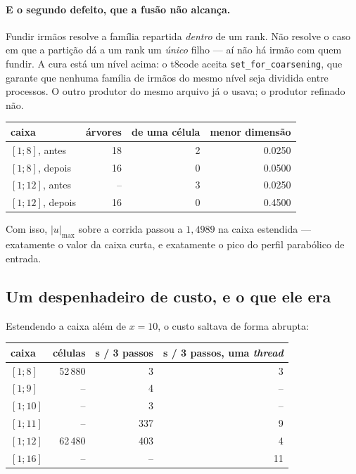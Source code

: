 \paragraph{E o segundo defeito, que a fusão não alcança.} Fundir irmãos resolve
a família repartida \emph{dentro} de um rank. Não resolve o caso em que a
partição dá a um rank um \emph{único} filho --- aí não há irmão com quem fundir.
A cura está um nível acima: o t8code aceita \texttt{set\_for\_coarsening}, que
garante que nenhuma família de irmãos do mesmo nível seja dividida entre
processos. O outro produtor do mesmo arquivo já o usava; o produtor refinado não.

\begin{center}
\begin{tabular}{lrrr}
  \toprule
  caixa & {árvores} & {de uma célula} & {menor dimensão} \\
  \midrule
  $[1;8]$,  antes   & 18 & 2 & 0.0250 \\
  $[1;8]$,  depois  & 16 & 0 & 0.0500 \\
  $[1;12]$, antes   & -- & 3 & 0.0250 \\
  $[1;12]$, depois  & 16 & 0 & 0.4500 \\
  \bottomrule
\end{tabular}
\end{center}

Com isso, $|u|_{\max}$ sobre a corrida passou a $1{,}4989$ na caixa estendida ---
exatamente o valor da caixa curta, e exatamente o pico do perfil parabólico de
entrada.

\subsection{Um despenhadeiro de custo, e o que ele era}

Estendendo a caixa além de $x=10$, o custo saltava de forma abrupta:

\begin{center}
\begin{tabular}{lrrr}
  \toprule
  caixa & {células} & {s / 3 passos} & {s / 3 passos, uma \emph{thread}} \\
  \midrule
  $[1;8]$  & 52\,880 &   3 &  3 \\
  $[1;9]$  & --      &   4 & -- \\
  $[1;10]$ & --      &   3 & -- \\
  $[1;11]$ & --      & 337 &  9 \\
  $[1;12]$ & 62\,480 & 403 &  4 \\
  $[1;16]$ & --      &  -- & 11 \\
  \bottomrule
\end{tabular}
\end{center}

